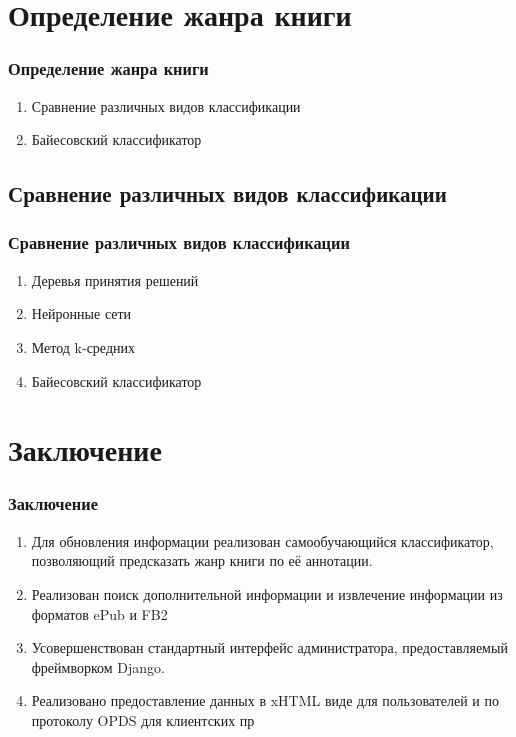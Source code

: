 \documentclass[handout]{beamer}
\begin{document}
\section{Определение жанра книги}
  \begin{frame}
    \frametitle{Определение жанра книги}  
    
    \begin{enumerate}
      \item Сравнение различных видов классификации
      \item Байесовский классификатор
    \end{enumerate}        
  \end{frame}

\subsection{Сравнение различных видов классификации}
  \begin{frame}
    \frametitle{Сравнение различных видов классификации}  
    
    \begin{enumerate}
      \item Деревья принятия решений
      \item Нейронные сети
      \item Метод k-средних
      \item Байесовский классификатор
    \end{enumerate}        
  \end{frame}


\section{Заключение}
  \begin{frame}
    \frametitle{Заключение}
    \begin{enumerate}
      \item Для обновления информации реализован самообучающийся классификатор, позволяющий предсказать жанр книги по её аннотации.
	  \item Реализован поиск дополнительной информации и извлечение информации из форматов ePub и FB2
	  \item Усовершенствован стандартный интерфейс администратора, предоставляемый фреймворком Django.
	  \item Реализовано предоставление данных в xHTML виде для пользователей и по протоколу OPDS для клиентских пр
    \end{enumerate}
  \end{frame}
\end{document}

